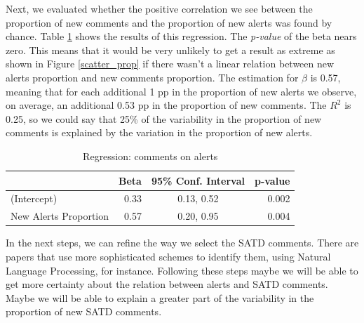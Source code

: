 \documentclass[
]{article}
\begin{document}
Next, we evaluated whether the positive correlation we see between the proportion of new comments and the proportion of new alerts was found by chance. Table \ref{tab_reg} shows the results of this regression. The \textit{p-value} of the beta nears zero. This means that it would be very unlikely to get a result as extreme as shown in Figure \ref{scatter_prop} if there wasn't a linear relation between new alerts proportion and new comments proportion. The estimation for \(\beta\) is 0.57, meaning that for each additional 1 pp in the proportion of new alerts we observe, on average, an additional 0.53 pp in the proportion of new comments. The \(R^2\) is 0.25, so we could say that 25\% of the variability in the proportion of new comments is explained by the variation in the proportion of new alerts.

%
%

%
%

%
%

%
%

\begin{table}[h!]
\caption{\label{tab:unnamed-chunk-25}\label{tab_reg} Regression: comments on alerts}
\centering
\begin{tabular}[t]{l|rcr}
\hline
 & Beta & 95\% Conf. Interval & p-value\\
\hline
(Intercept) & 0.33 & 0.13, 0.52 & 0.002\\
New Alerts Proportion & 0.57 & 0.20, 0.95 & 0.004\\
\hline
\end{tabular}
\end{table}

In the next steps, we can refine the way we select the SATD comments. There are papers that use more sophisticated schemes to identify them, using Natural Language Processing, for instance. Following these steps maybe we will be able to get more certainty about the relation between alerts and SATD comments. Maybe we will be able to explain a greater part of the variability in the proportion of new SATD comments.

%
%
\end{document}
